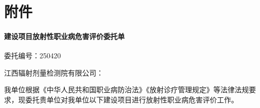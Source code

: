 \clearpage
{}
{}

\renewcommand{\thechapter}{}
\setcounter{chapter}{0}
\renewcommand{\thesection}{附件\arabic{section}}
\setcounter{section}{0}

\chapter*{附件}

\subsubsection{建设项目放射性职业病危害评价委托单}

委托编号：250420

江西辐射剂量检测院有限公司：

我单位根据《中华人民共和国职业病防治法》《放射诊疗管理规定》等法律法规要求，现委托贵单位对我单位以下建设项目进行放射性职业病危害评价工作。

